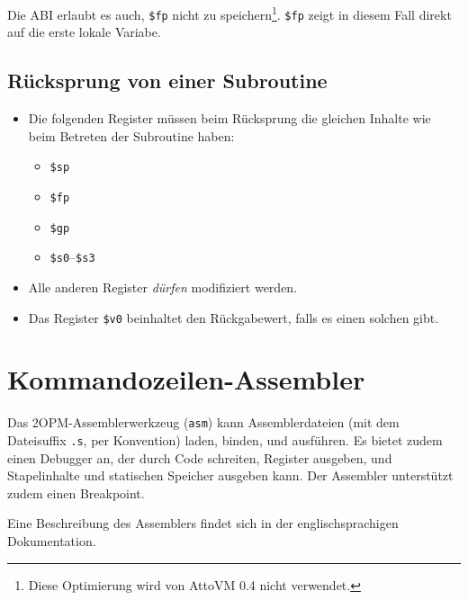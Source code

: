 \documentclass[11pt,a4paper]{article}
\begin{document}
    Die ABI erlaubt es auch, \texttt{\$fp} nicht zu speichern\footnote{Diese Optimierung wird von AttoVM 0.4 nicht verwendet.}.
    \texttt{\$fp} zeigt in diesem Fall direkt auf die erste lokale Variabe.

\subsection{Rücksprung von einer Subroutine}
  \begin{itemize}
    \item Die folgenden Register müssen beim Rücksprung die gleichen Inhalte wie beim Betreten der Subroutine haben:
      \begin{itemize}
        \item \texttt{\$sp}
        \item \texttt{\$fp}
        \item \texttt{\$gp}
        \item \texttt{\$s0}--\texttt{\$s3}
      \end{itemize}
    \item Alle anderen Register \emph{dürfen} modifiziert werden.
    \item Das Register \texttt{\$v0} beinhaltet den Rückgabewert, falls es einen solchen gibt.
  \end{itemize}

\section{Kommandozeilen-Assembler}

Das  2OPM-Assemblerwerkzeug (\texttt{asm}) kann Assemblerdateien 
(mit dem Dateisuffix \texttt{.s}, per Konvention) laden, binden, und ausführen.  Es bietet zudem einen Debugger an,
der durch
Code schreiten, Register ausgeben, und Stapelinhalte und statischen Speicher ausgeben kann.
Der Assembler unterstützt zudem einen Breakpoint.

Eine Beschreibung des Assemblers findet sich in der englischsprachigen Dokumentation.


\end{document}
